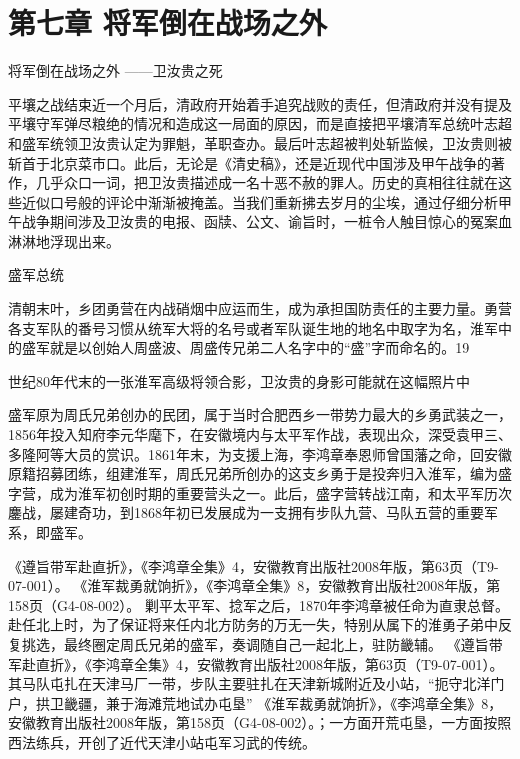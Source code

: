 \documentclass[12pt,UTF8]{ctexbook}
\begin{document}
\chapter{第七章 将军倒在战场之外}

将军倒在战场之外
——卫汝贵之死

平壤之战结束近一个月后，清政府开始着手追究战败的责任，但清政府并没有提及平壤守军弹尽粮绝的情况和造成这一局面的原因，而是直接把平壤清军总统叶志超和盛军统领卫汝贵认定为罪魁，革职查办。最后叶志超被判处斩监候，卫汝贵则被斩首于北京菜市口。此后，无论是《清史稿》，还是近现代中国涉及甲午战争的著作，几乎众口一词，把卫汝贵描述成一名十恶不赦的罪人。历史的真相往往就在这些近似口号般的评论中渐渐被掩盖。当我们重新拂去岁月的尘埃，通过仔细分析甲午战争期间涉及卫汝贵的电报、函牍、公文、谕旨时，一桩令人触目惊心的冤案血淋淋地浮现出来。

盛军总统

清朝末叶，乡团勇营在内战硝烟中应运而生，成为承担国防责任的主要力量。勇营各支军队的番号习惯从统军大将的名号或者军队诞生地的地名中取字为名，淮军中的盛军就是以创始人周盛波、周盛传兄弟二人名字中的“盛”字而命名的。19


世纪80年代末的一张淮军高级将领合影，卫汝贵的身影可能就在这幅照片中

盛军原为周氏兄弟创办的民团，属于当时合肥西乡一带势力最大的乡勇武装之一，1856年投入知府李元华麾下，在安徽境内与太平军作战，表现出众，深受袁甲三、多隆阿等大员的赏识。1861年末，为支援上海，李鸿章奉恩师曾国藩之命，回安徽原籍招募团练，组建淮军，周氏兄弟所创办的这支乡勇于是投奔归入淮军，编为盛字营，成为淮军初创时期的重要营头之一。此后，盛字营转战江南，和太平军历次鏖战，屡建奇功，到1868年初已发展成为一支拥有步队九营、马队五营的重要军系，即盛军。

《遵旨带军赴直折》，《李鸿章全集》4，安徽教育出版社2008年版，第63页（T9-07-001）。
《淮军裁勇就饷折》，《李鸿章全集》8，安徽教育出版社2008年版，第158页（G4-08-002）。
剿平太平军、捻军之后，1870年李鸿章被任命为直隶总督。赴任北上时，为了保证将来任内北方防务的万无一失，特别从属下的淮勇子弟中反复挑选，最终圈定周氏兄弟的盛军，奏调随自己一起北上，驻防畿辅。 《遵旨带军赴直折》，《李鸿章全集》4，安徽教育出版社2008年版，第63页（T9-07-001）。其马队屯扎在天津马厂一带，步队主要驻扎在天津新城附近及小站，“扼守北洋门户，拱卫畿疆，兼于海滩荒地试办屯垦” 《淮军裁勇就饷折》，《李鸿章全集》8，安徽教育出版社2008年版，第158页（G4-08-002）。；一方面开荒屯垦，一方面按照西法练兵，开创了近代天津小站屯军习武的传统。
\end{document}
